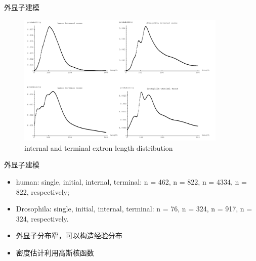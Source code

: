 \documentclass[handout]{beamer}
\begin{document}
\begin{frame}{外显子建模}
\begin{figure}
\centering
\includegraphics[width=10cm]{../pic/extron-length-2}
\caption{internal and terminal extron length distribution}
\end{figure}
\end{frame}

\begin{frame}{外显子建模}
\begin{itemize}
        \item  human: single, initial, internal, terminal:
        n = 462, n = 822, n = 4334, n = 822, respectively;
        \item Drosophila: single, initial, internal,
        terminal: n = 76, n = 324, n = 917, n = 324, respectively.
        \item 外显子分布窄，可以构造经验分布
        \item 密度估计利用高斯核函数
\end{itemize}   
\end{frame}
\end{document}
